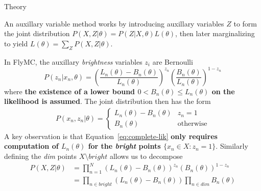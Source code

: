 \documentclass[final]{beamer}
\newlength{\onecolwid}
\newlength{\twocolwid}
\begin{document}
\begin{frame}[t]
\begin{columns}[t]
\begin{column}{\twocolwid}
\begin{columns}[t,totalwidth=\twocolwid] %

\begin{column}{\onecolwid}\vspace{-.6in} %


\begin{block}{Theory}

An auxillary variable method works by introducing auxillary variables $Z$
to form the joint distribution $P(X,Z|\theta) = P(Z|X,\theta) L(\theta)$,
then later marginalizing to yield $L(\theta) = \sum_Z P(X,Z|\theta)$.

In FlyMC, the auxillary \emph{brightness} variables $z_i$ are Bernoulli
\begin{equation}
  \label{eq:brightness}
  P(z_n | x_n, \theta)
  = \left(
  \frac{L_n(\theta) - B_n(\theta)}{L_n(\theta)}
  \right)^{z_n} \left(
  \frac{B_n(\theta)}{L_n(\theta)}
  \right)^{1-z_n}
\end{equation}
where \textbf{the existence of a lower bound $0 < B_n(\theta) \leq L_n(\theta)$ on
the likelihood is assumed}. The joint distribution then has the form
\begin{align}
  \label{eq:complete-lik}
  P(x_n,z_n|\theta) = \begin{cases}
    L_n(\theta) - B_n(\theta) & z_n = 1\\
    B_n(\theta) & \text{otherwise}
  \end{cases}
\end{align}
A key observation is that Equation~\ref{eq:complete-lik} \textbf{only
requires computation of $L_n(\theta)$ for the \emph{bright} points $\{x_n \in
X : z_n = 1\}$}. Similarly defining the \emph{dim} points $X \setminus
bright$ allows us to decompose
\begin{align}
  \label{eq:complete-lik-all-data}
  P(X,Z|\theta)
  &= \prod_{n=1}^N (L_n(\theta) - B_n(\theta))^{z_n} (B_n(\theta))^{1 - z_n} \\
  &= \prod_{n \in bright} (L_n(\theta) - B_n(\theta)) \prod_{n \in dim} B_n(\theta)
\end{align}


\end{block}
\end{column}
\end{columns}
\end{column}
\end{columns}
\end{frame}
\end{document}
